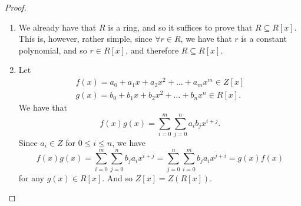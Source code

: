 \begin{proof}
\begin{enumerate}
\begin{itemize}
\begin{align*}
          \end{align*}
        \item (\textbf{Inverse}) Since $R$ is a ring, and in particular an additive ring, for each $a_i \in R$, $0 \leq i \leq m$, we have that $\exists (-a_i) \in R$ such that $a_i + (-a_i) = 0$. Particularly, we have that
          \begin{equation*}
            - f(x) = ( - a_0 ) + ( - a_1 ) x + ( - a_2 ) x^2 + \hdots + ( - a_m ) x^m
          \end{equation*}
          is the inverse of $f(x) \in R[x]$.
        \item (\textbf{Distributivity}) Again, using the summation notation, since $R$ is a ring, we have
          \begin{align*}
            &f(x) [ g(x) + h(x) ] \\
            &= \left[ \sum_{i=0}^{m} a_i x^i \right] \left[ \sum_{j=0}^{n} b_j x^j + \sum_{l=0}^{k} d_l x^l \right] \\
            &= \left[ \sum_{i=0}^{m} a_i x^i \right] \left[ \sum_{j=0}^{k} (b_j + d_j) x^j \right] \\
            &= \sum_{i=0}^{m} \sum_{j=0}^{k} a_i (b_j + d_j) x^{i + j} = \sum_{i=0}^{m} \sum_{j=0}^{k} (a_i b_j + a_i d_j) x^{i + j} \\
            &= \sum_{i=0}^{m} \sum_{j=0}^{k} a_i b_j x^{i + j} + \sum_{i=0}^{m} \sum_{j=0}^{k} a_i d_j x^{i + j} \\
            &= \sum_{i=0}^{m} \sum_{j=0}^{n} a_i b_j x^{i + j} + \sum_{i=0}^{m} \sum_{j=0}^{k} a_i d_j x^{i + j} \\
            &= f(x) g(x) + f(x) d(x).
          \end{align*}
          Proof for the other side is similar.
        \end{itemize}
        With that, we have that $R[x]$ is a ring.

      \item We already have that $R$ is a ring, and so it suffices to prove that $R \subseteq R[x]$. This is, however, rather simple, since $\forall r \in R$, we have that $r$ is a constant polynomial, and so $r \in R[x]$, and therefore $R \subseteq R[x]$.

      \item Let
        \begin{gather*}
          f(x) = a_0 + a_1 x + a_2 x^2 + \hdots + a_m x^m \in Z[x] \\
          g(x) = b_0 + b_1 x + b_2 x^2 + \hdots + b_n x^n \in R[x].
        \end{gather*}
        We have that
        \begin{equation*}
          f(x) g(x) = \sum_{i=0}^{m} \sum_{j=0}^{n} a_i b_j x^{i + j}.
        \end{equation*}
        Since $a_i \in Z$ for $0 \leq i \leq n$, we have
        \begin{equation*}
          f(x) g(x) = \sum_{i=0}^{m} \sum_{j=0}^{n} b_j a_i x^{i + j} = \sum_{j=0}^{n} \sum_{i=0}^{m} b_j a_i x^{j + i} = g(x) f(x)
        \end{equation*}
        for any $g(x) \in R[x]$. And so $Z[x] = Z(R[x])$.


\end{enumerate}
\end{proof}

